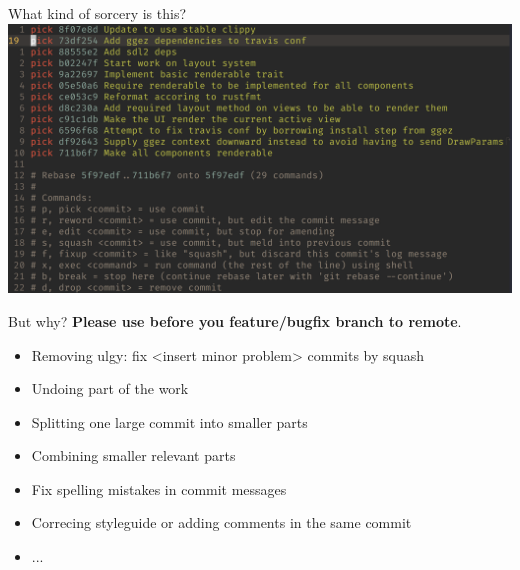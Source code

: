 \documentclass[10pt]{beamer}
\begin{document}
\begin{frame}[plain]{What kind of sorcery is this?}
  \includegraphics[width=\textwidth]{rebasing}
\end{frame}

\begin{frame}{But why?}
  \textbf{Please use before you feature/bugfix branch to remote}.
  \begin{itemize}
    \item Removing ulgy: fix <insert minor problem> commits by squash
    \item Undoing part of the work
    \item Splitting one large commit into smaller parts
    \item Combining smaller relevant parts
		\item Fix spelling mistakes in commit messages
    \item Correcing styleguide or adding comments in the same commit
    \item ...
	\end{itemize}
\end{frame}
\end{document}
